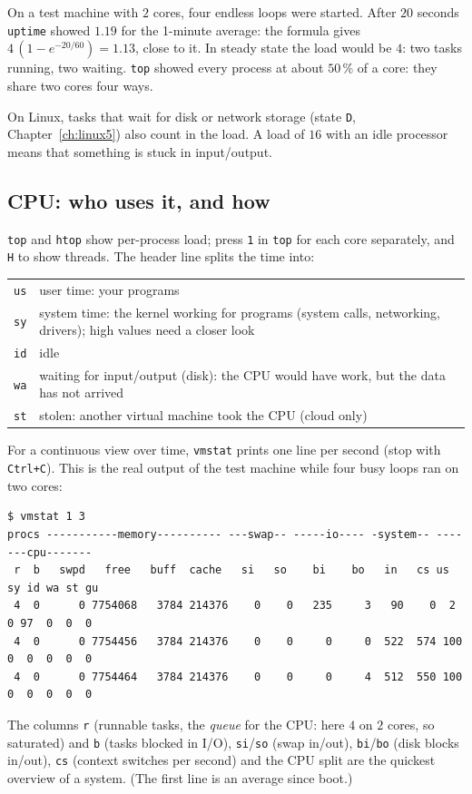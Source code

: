 \begin{example}
On a test machine with $2$ cores, four endless loops were started. After $20$ seconds \texttt{uptime} showed $1.19$ for the 1-minute average: the formula gives $4\,(1-e^{-20/60})=1.13$, close to it. In steady state the load would be $4$: two tasks running, two waiting. \texttt{top} showed every process at about $50\,\%$ of a core: they share two cores four ways.
\end{example}

\begin{keyidea}
On Linux, tasks that wait for disk or network storage (state \texttt{D}, Chapter~\ref{ch:linux5}) also count in the load. A load of $16$ with an idle processor means that something is stuck in input/output.
\end{keyidea}

\subsection*{CPU: who uses it, and how}
\texttt{top} and \texttt{htop} show per-process load; press \texttt{1} in \texttt{top} for each core separately, and \texttt{H} to show threads. The header line splits the time into:
\begin{center}
\renewcommand{\arraystretch}{1.15}
\begin{tabular}{cp{11.6cm}}
\texttt{us} & user time: your programs\\
\texttt{sy} & system time: the kernel working for programs (system calls, networking, drivers); high values need a closer look\\
\texttt{id} & idle\\
\texttt{wa} & waiting for input/output (disk): the CPU would have work, but the data has not arrived\\
\texttt{st} & stolen: another virtual machine took the CPU (cloud only)\\
\end{tabular}
\end{center}
For a continuous view over time, \texttt{vmstat} prints one line per second (stop with \texttt{Ctrl+C}). This is the real output of the test machine while four busy loops ran on two cores:
{\scriptsize
\begin{verbatim}
$ vmstat 1 3
procs -----------memory---------- ---swap-- -----io---- -system-- -------cpu-------
 r  b   swpd   free   buff  cache   si   so    bi    bo   in   cs us sy id wa st gu
 4  0      0 7754068   3784 214376    0    0   235     3   90    0  2  0 97  0  0  0
 4  0      0 7754456   3784 214376    0    0     0     0  522  574 100  0  0  0  0  0
 4  0      0 7754464   3784 214376    0    0     0     4  512  550 100  0  0  0  0  0
\end{verbatim}
}
The columns \texttt{r} (runnable tasks, the \emph{queue} for the CPU: here $4$ on $2$ cores, so saturated) and \texttt{b} (tasks blocked in I/O), \texttt{si}/\texttt{so} (swap in/out), \texttt{bi}/\texttt{bo} (disk blocks in/out), \texttt{cs} (context switches per second) and the CPU split are the quickest overview of a system. (The first line is an average since boot.)

